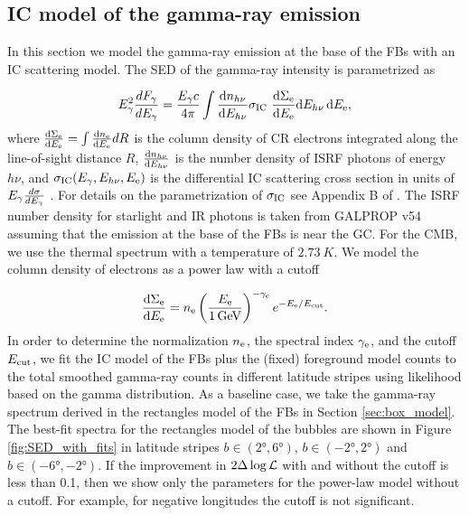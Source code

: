 \subsection{IC model of the gamma-ray emission}
\label{sec:IC_model}

In this section we model the gamma-ray emission at the base of the FBs with an IC scattering model.
The SED of the gamma-ray intensity is parametrized as

\begin{equation}
E^2_\g \frac{dF_\g}{dE_\g} = 
\frac{E_\g c}{4\pi}\int \frac{\de n_{h\nu}}{\de E_{h\nu}} \sigma_\IC\ \frac{\de \Sigma_{\el}}{\de E_{\el}} \de E_{h\nu}\, \de E_\el,
\end{equation}
where $\frac{\text{d} \Sigma_{\text{e}}}{\text{d} E_{\text{e}}} = \int \frac{\text{d} n_{\text{e}}}{\text{d} E_{\text{e}}} dR$ is the column density 
of CR electrons integrated along the line-of-sight distance $R$,
$\frac{\text{d} n_{h\nu}}{\text{d} E_{h\nu}}$ is the number density of ISRF photons of energy $h\nu$,
and $\sigma_{\text{IC}}(E_\gamma, E_{h\nu}, E_{\text{e}})$
is the differential IC scattering cross section in units of $E_\gamma\frac{d\sigma}{d E_\gamma}$ \citep{1970RvMP...42..237B}.
For details on the parametrization of $\sigma_{\text{IC}}$ see Appendix B of \cite{2014ApJ...793...64A}.
The ISRF number density for starlight and IR photons is taken from GALPROP v54 \citep{2006ApJ...640L.155M}
assuming that the emission at the base of the FBs is near the GC.
For the CMB, we use the thermal spectrum with a temperature of $\SI{2.73}{K}$.
We model the column density of electrons as a power law with a cutoff

\begin{equation} 
\label{eq:e_spectrum}
 \frac{\text{d} \Sigma_{\text{e}}}{\text{d} E_{\text{e}}} = n_{\text{e}} \left(\frac{E_{\text{e}}}{\SI{1}{GeV}}\right)^{-\gamma_{\text{e}}} e^{- E_{\text{e}} / E_{\text{cut}}}.
\end{equation}
In order to determine the normalization $n_{\text{e}}$, the spectral index $\gamma_{\text{e}}$, and the cutoff  $E_{\text{cut}}$, 
we fit the IC model of the FBs plus the (fixed) foreground model counts to the 
total smoothed gamma-ray counts in different latitude stripes using likelihood based on the gamma distribution.
As a baseline case, we take the gamma-ray spectrum derived in the rectangles model of the FBs in Section \ref{sec:box_model}.
The best-fit spectra for the rectangles model of the bubbles are shown in Figure \ref{fig:SED_with_fits}
in latitude stripes $b \in (\ang{2}, \ang{6})$, $b \in (-\ang{2}, \ang{2})$ and $b \in (-\ang{6}, -\ang{2})$. 
If the improvement in $2 \Delta \log {\mathcal{L}}$ with and without the cutoff is less than 0.1, then we show only the parameters for the power-law model without a cutoff.
For example, for negative longitudes the cutoff is not significant.

